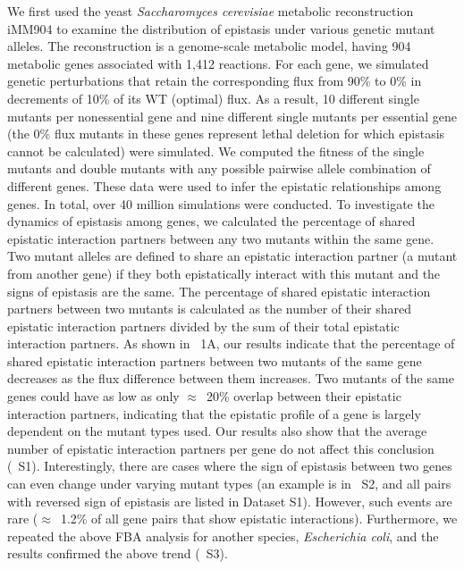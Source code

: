 We first used the yeast \textit{Saccharomyces cerevisiae} metabolic
reconstruction iMM904 \citep{Mo2009} to examine the distribution of epistasis
under various genetic mutant alleles. The reconstruction is a
genome-scale metabolic model, having 904 metabolic genes associated
with 1,412 reactions. For each gene, we simulated genetic
perturbations that retain the corresponding flux from 90\% to 0\% in
decrements of 10\% of its WT (optimal) flux. As a result, 10 different
single mutants per nonessential gene and nine different single mutants
per essential gene (the 0\% flux mutants in these genes represent
lethal deletion for which epistasis cannot be calculated) were
simulated. We computed the fitness of the single mutants and double
mutants with any possible pairwise allele combination of different
genes. These data were used to infer the epistatic relationships among
genes. In total, over 40 million simulations were conducted.  To
investigate the dynamics of epistasis among genes, we calculated the
percentage of shared epistatic interaction partners between any two
mutants within the same gene. Two mutant alleles are defined to share
an epistatic interaction partner (a mutant from another gene) if they
both epistatically interact with this mutant and the signs of
epistasis are the same. The percentage of shared epistatic interaction
partners between two mutants is calculated as the number of their
shared epistatic interaction partners divided by the sum of their
total epistatic interaction partners. As shown in \Fig~1A, our results
indicate that the percentage of shared epistatic interaction partners
between two mutants of the same gene decreases as the flux difference
between them increases. Two mutants of the same genes could have as
low as only $\approx$~20\% overlap between their epistatic interaction
partners, indicating that the epistatic profile of a gene is largely
dependent on the mutant types used. Our results also show that the
average number of epistatic interaction partners per gene do not
affect this conclusion (\Fig~S1). Interestingly, there are cases where
the sign of epistasis between two genes can even change under varying
mutant types (an example is in \Fig~S2, and all pairs with reversed
sign of epistasis are listed in Dataset S1). However, such events are
rare ($\approx$~1.2\% of all gene pairs that show epistatic
interactions). Furthermore, we repeated the above FBA analysis for
another species, \textit{Escherichia coli}, and the results confirmed
the above trend (\Fig~S3).

\label{fig:alleleSpecific}

